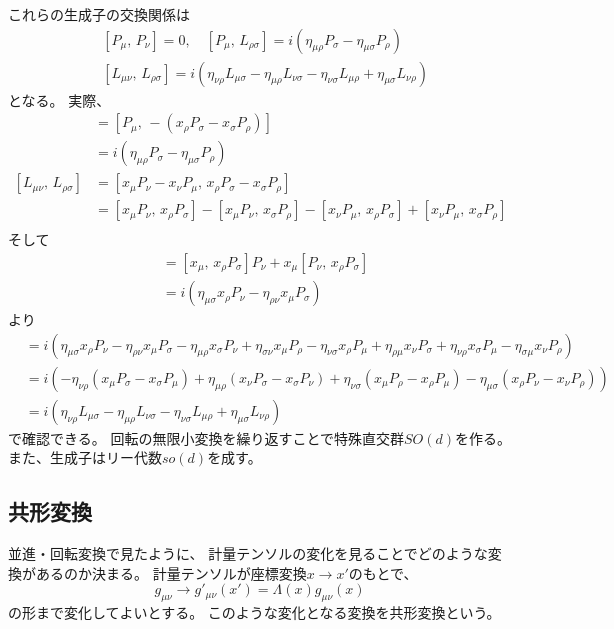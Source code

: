 \documentclass[../../master.tex]{subfiles}
\begin{document}
これらの生成子の交換関係は
\begin{equation}
    \begin{split}
        &[P_\mu,\,P_\nu]=0,\quad [P_\mu,\,L_{\rho\sigma}] = i(\eta_{\mu\rho}P_\sigma-\eta_{\mu\sigma}P_\rho)\\
        &[L_{\mu\nu},\,L_{\rho\sigma}] = i(\eta_{\nu\rho}L_{\mu\sigma}-\eta_{\mu\rho}L_{\nu\sigma}-\eta_{\nu\sigma}L_{\mu\rho}+\eta_{\mu\sigma}L_{\nu\rho})
    \end{split}
\end{equation}
となる。
実際、
\begin{align*}
    [P_\mu,\,L_{\rho\sigma}]
    &= [P_\mu,\,-(x_\rho P_\sigma-x_\sigma P_\rho)]\\
    &= i(\eta_{\mu\rho}P_\sigma-\eta_{\mu\sigma}P_\rho)\\
    [L_{\mu\nu},\,L_{\rho\sigma}]
    &=[x_\mu P_\nu-x_\nu P_\mu,\,x_\rho P_\sigma-x_\sigma P_\rho]\\
    &=[x_\mu P_\nu,\,x_\rho P_\sigma]-[x_\mu P_\nu,\,x_\sigma P_\rho]
        -[x_\nu P_\mu,\,x_\rho P_\sigma]+[x_\nu P_\mu,\,x_\sigma P_\rho]\\
\end{align*}
そして
\begin{align*}
    [x_\mu P_\nu,\,x_\rho P_\sigma]
    &=[x_\mu,\,x_\rho P_\sigma]P_\nu + x_\mu [P_\nu,\,x_\rho P_\sigma]\\
    &=i(\eta_{\mu\sigma}x_\rho P_\nu - \eta_{\rho\nu} x_\mu P_\sigma)
\end{align*}
より
\begin{align*}
    [L_{\mu\nu},\,L_{\rho\sigma}]
    &= i(
        \eta_{\mu\sigma}x_\rho P_\nu - \eta_{\rho\nu} x_\mu P_\sigma
        -\eta_{\mu\rho}x_\sigma P_\nu + \eta_{\sigma\nu} x_\mu P_\rho
        -\eta_{\nu\sigma}x_\rho P_\mu + \eta_{\rho\mu} x_\nu P_\sigma
        +\eta_{\nu\rho}x_\sigma P_\mu - \eta_{\sigma\mu} x_\nu P_\rho
    )\\
    &= i(
        -\eta_{\nu\rho}(x_\mu P_\sigma-x_\sigma P_\mu) + \eta_{\mu\rho}(x_\nu P_\sigma-x_\sigma P_\nu)
        +\eta_{\nu\sigma}(x_\mu P_\rho-x_\rho P_\mu) - \eta_{\mu\sigma}(x_\rho P_\nu-x_\nu P_\rho)
    )\\
    &=i(\eta_{\nu\rho}L_{\mu\sigma}-\eta_{\mu\rho}L_{\nu\sigma}-\eta_{\nu\sigma}L_{\mu\rho}+\eta_{\mu\sigma}L_{\nu\rho})
\end{align*}
で確認できる。
回転の無限小変換を繰り返すことで特殊直交群\(SO(d)\)を作る。
また、生成子はリー代数\(so(d)\)を成す。

\subsection*{共形変換}
並進・回転変換で見たように、
計量テンソルの変化を見ることでどのような変換があるのか決まる。
計量テンソルが座標変換\(x\rightarrow x'\)のもとで、
\begin{equation}
    g_{\mu\nu}\rightarrow g'_{\mu\nu}(x') = \Lambda(x)g_{\mu\nu}(x)
\end{equation}
の形まで変化してよいとする。
このような変化となる変換を共形変換という。
\end{document}
